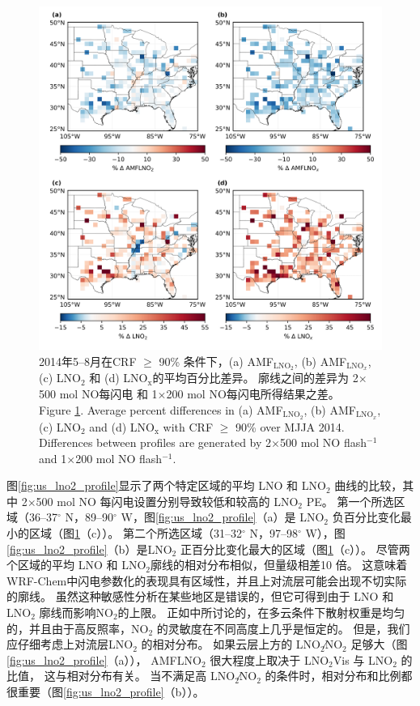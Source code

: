 \begin{figure}[!htbp]
\centering
\includegraphics[width=13cm]{./figures/us_simulation_diff.png}
\caption{2014年5--8月在CRF $\geq$ 90\% 条件下，(a) AMF$_{\textrm{LNO$_2$}}$, (b) AMF$_{\textrm{LNO$_x$}}$, (c) LNO$_\textrm{2}$ 和 (d) LNO$_\textrm{x}$的平均百分比差异。
廓线之间的差异为 2$\times$500 mol NO每闪电 和 1$\times$200 mol NO每闪电所得结果之差。\\
Figure \ref{fig:us_simulation_diff}. Average percent differences in (a) AMF$_{\textrm{LNO$_2$}}$, (b) AMF$_{\textrm{LNO$_x$}}$, (c) LNO$_\textrm{2}$ and (d) LNO$_\textrm{x}$ with CRF $\geq$ 90\% over MJJA 2014.
Differences between profiles are generated by 2$\times$500 mol NO flash$^{-1}$ and 1$\times$200 mol NO flash$^{-1}$.}
\label{fig:us_simulation_diff}
\end{figure}

图\ref{fig:us_lno2_profile}显示了两个特定区域的平均 LNO 和 LNO$_2$ 曲线的比较，其中 2$\times$500 mol NO 每闪电设置分别导致较低和较高的 LNO$_2$ PE。
第一个所选区域（36--37$^{\circ}$ N，89--90$^{\circ}$ W，图\ref{fig:us_lno2_profile}（a）是 LNO$_2$ 负百分比变化最小的区域（图\ref{fig:us_simulation_diff}（c））。
第二个所选区域（31--32$^{\circ}$ N，97--98$^{\circ}$ W），图\ref{fig:us_lno2_profile}（b）是LNO$_2$ 正百分比变化最大的区域（图\ref{fig:us_simulation_diff}（c））。
尽管两个区域的平均 LNO 和 LNO$_2$廓线的相对分布相似，但量级相差10 倍。
这意味着 WRF-Chem中闪电参数化的表现具有区域性，并且上对流层可能会出现不切实际的廓线。
虽然这种敏感性分析在某些地区是错误的，但它可得到由于 LNO 和 LNO$_2$ 廓线而影响NO$_2$的上限。
正如\citet{Laughner.2017}中所讨论的，在多云条件下散射权重是均匀的，并且由于高反照率，NO$_2$ 的灵敏度在不同高度上几乎是恒定的。
但是，我们应仔细考虑上对流层LNO$_2$ 的相对分布。
如果云层上方的 LNO$_2$∕NO$_2$ 足够大（图\ref{fig:us_lno2_profile}（a）），
AMFLNO$_2$ 很大程度上取决于 LNO$_2$Vis 与 LNO$_2$ 的比值，
这与相对分布有关。
当不满足高 LNO$_2$∕NO$_2$ 的条件时，相对分布和比例都很重要（图\ref{fig:us_lno2_profile}（b））。

